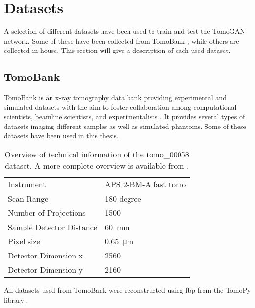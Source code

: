 
\section{Datasets}
\label{sec:method:datasets}
A selection of different datasets have been used to train and test the TomoGAN network. Some of these have been collected from TomoBank \cite{TomoBank}, while others are collected in-house. This section will give a description of each used dataset. 

\subsection{TomoBank}
TomoBank is an x-ray tomography data bank providing experimental and simulated datasets with the aim to foster collaboration among computational scientists, beamline scientists, and experimentalists \cite{TomoBank}. It provides several types of datasets imaging different samples as well as simulated phantoms. Some of these datasets have been used in this thesis.


\begin{table}[htbp]
    \centering
    \caption[Dataset information tomo\_00058]{Overview of technical information of the tomo\_00058 dataset. A more complete overview is available from \cite{datasetglassspheres}. }
    \label{tab:tomo00058}
    \begin{tabular}{ll}
    \hline
    Instrument & APS 2-BM-A fast tomo \\
    Scan Range & 180 degree \\
    Number of Projections & 1500 \\
    Sample Detector Distance & \SI{60}{\milli \meter} \\
    Pixel size & \SI{0.65}{\micro \meter} \\
    Detector Dimension x & 2560 \\
    Detector Dimension y & 2160 \\
    \hline
    \end{tabular}
\end{table}

All datasets used from TomoBank were reconstructed using \acrshort{fbp} from the TomoPy library \cite{tomopy}. 


